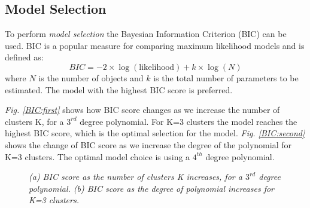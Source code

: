 \subsection{Model Selection} \label{meth-synth-model-subsect}
To perform \emph{model selection} the Bayesian Information Criterion (BIC) \citep{Schwarz1978} can be used. BIC is a popular measure for comparing maximum likelihood models and is defined as:
\begin{equation}
	BIC = -2 \times \log (\text{likelihood}) + k \times \log (N)
\end{equation}
where $N$ is the number of objects and $k$ is the total number of parameters to be estimated. The model with the highest BIC score is preferred.

\emph{Fig. \ref{BIC:first}} shows how BIC score changes as we increase the number of clusters K, for a $3^{rd}$ degree polynomial. For K=3 clusters the model reaches the highest BIC score, which is the optimal selection for the model. \emph{Fig. \ref{BIC:second}} shows the change of BIC score as we increase the degree of the polynomial for K=3 clusters. The optimal model choice is using a $4^{th}$ degree polynomial.
\begin{figure}[ht!]
     \begin{center}
    \end{center}
    \caption{\emph{(a) BIC score as the number of clusters K increases, for a $3^{rd}$ degree polynomial. (b) BIC score as the degree of polynomial increases for K=3 clusters.}}
   \label{BIC-pic}
\end{figure}